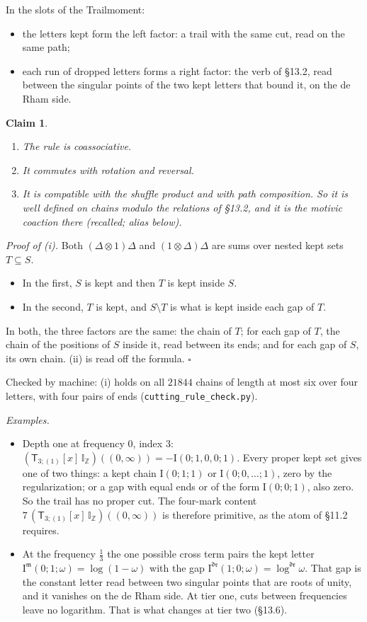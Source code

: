 \documentclass[11pt]{article}
\newcommand{\sT}{\mathsf T}
\newcommand{\IZ}{\mathbb I_{\mathbb Z}}
\newcommand{\Tx}[3]{(\sT_{#1;(1)}[x]\,#2)((#3,\infty))}
\theoremstyle{plain}
\newtheorem{claim}{Claim}[section]
\theoremstyle{remark}
\begin{document}
In the slots of the Trailmoment:
\begin{itemize}
\item the letters kept form the left factor: a trail with the same cut, read on the same path;
\item each run of dropped letters forms a right factor: the verb of \S13.2, read between the singular points of the two kept letters that bound it, on the de Rham side.
\end{itemize}

\begin{claim}\label{cl:cutting}
\begin{enumerate}[label=(\roman*)]
\item The rule is coassociative.
\item It commutes with rotation and reversal.
\item It is compatible with the shuffle product and with path composition. So it is well defined on chains modulo the relations of \S13.2, and it is the motivic coaction there (recalled; alias below).
\end{enumerate}
\end{claim}

\emph{Proof of (i).} Both $(\Delta\otimes1)\Delta$ and $(1\otimes\Delta)\Delta$ are sums over nested kept sets $T\subseteq S$.
\begin{itemize}
\item In the first, $S$ is kept and then $T$ is kept inside $S$.
\item In the second, $T$ is kept, and $S\setminus T$ is what is kept inside each gap of $T$.
\end{itemize}
In both, the three factors are the same: the chain of $T$; for each gap of $T$, the chain of the positions of $S$ inside it, read between its ends; and for each gap of $S$, its own chain. (ii) is read off the formula. $\square$

Checked by machine: (i) holds on all $21844$ chains of length at most six over four letters, with four pairs of ends (\texttt{cutting\_rule\_check.py}).

\emph{Examples.}
\begin{itemize}
\item Depth one at frequency $0$, index $3$: $\Tx3{\IZ}0=-\mathrm I(0;1,0,0;1)$. Every proper kept set gives one of two things: a kept chain $\mathrm I(0;1;1)$ or $\mathrm I(0;0,\dots;1)$, zero by the regularization; or a gap with equal ends or of the form $\mathrm I(0;0;1)$, also zero. So the trail has no proper cut. The four-mark content $7\,\Tx3{\IZ}0$ is therefore primitive, as the atom of \S11.2 requires.
\item At the frequency $\frac13$ the one possible cross term pairs the kept letter $\mathrm I^{\mathfrak m}(0;1;\omega)=\log(1-\omega)$ with the gap $\mathrm I^{\mathfrak{dr}}(1;0;\omega)=\log^{\mathfrak{dr}}\omega$. That gap is the constant letter read between two singular points that are roots of unity, and it vanishes on the de Rham side. At tier one, cuts between frequencies leave no logarithm. That is what changes at tier two (\S13.6).
\end{itemize}
\end{document}
